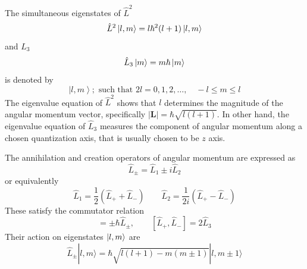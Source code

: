 \documentclass[../../../main.tex]{subfiles}
\begin{document}
The simultaneous eigenstates of $\hat{L}^2$
\begin{equation*}
    \hat{L}^2 \ket{l,m} = l \hbar ^2 (l+1) \ket{l,m}
\end{equation*}
and $\hat{L}_3$
\begin{equation*}
    \hat{L }_3 \ket{m}= m \hbar \ket{m}
\end{equation*}
is denoted by
\begin{equation*}
    \left| l, m \right\rangle; \text{ such that } 2l = 0, 1, 2, \ldots, \quad -l \leq m \leq l
\end{equation*}
The eigenvalue equation of $\hat{L}^2$ shows that $l$ determines the magnitude of the angular momentum vector, specifically $|\mathbf{L}|=\hbar \sqrt{l(l+1)}$.
In other hand, the eigenvalue equation of $\hat{L }_3$ measures the component of angular momentum along a chosen quantization axis, that is usually chosen to be $z$ axis.

The annihilation and  creation operators of angular momentum are expressed as
\begin{equation*}
    \hat{L}_{\pm} = \hat{L}_1 \pm i \hat{L}_2
\end{equation*}
or equivalently
\begin{equation*}
    \hat{L}_1 = \frac{1}{2}(\hat{L}_{+} + \hat{L}_{-})\qquad
    \hat{L}_2 = \frac{1}{2i}(\hat{L}_{+} - \hat{L}_{-})
\end{equation*}
These satisfy the commutator relation
\begin{equation*}
    [\hat{L}_3,\hat{L}_{\pm}] = \pm \hbar  \hat{L}_{\pm}, \qquad
    [\hat{L}_+,\hat{L}_-]=2\hat{L}_3
\end{equation*}
Their action on eigenstates $\ket{l,m}$ are
\begin{equation*}
    \hat{L}_{\pm}   |l, m\rangle = \hbar \sqrt{l(l+1) - m(m \pm 1)}   |l, m \pm 1\rangle
\end{equation*}
\end{document}
